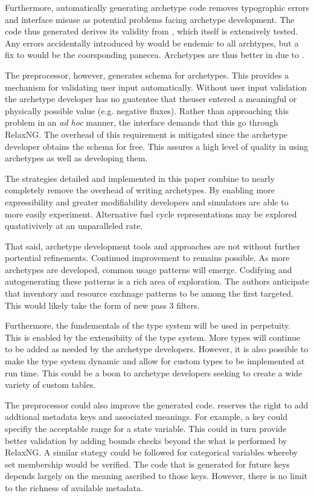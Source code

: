 Furthermore, automatically generating archetype code removes typographic errors and 
\cyclus interface misuse as potential problems facing archetype development. The 
code thus generated derives its validity from \cycpp, which itself is extensively 
tested. Any errors accidentally introduced by \cycpp would be endemic to all archtypes, 
but a fix to \cycpp would be the coorsponding panecea. Archetypes are thus 
better in \cyclus due to \cycpp.

The preprocessor, however, generates schema for archetypes. This provides a mechanism 
for validating user input automatically.  Without user input validation the archetype 
developer has no guatentee that theuser entered a meaningful or physically possible 
value (e.g. negative fluxes). Rather than approaching this problem in an \emph{ad hoc}
manner, the \cyclus interface demands that this go through RelaxNG.  The overhead 
of this requirement is mitigated since the archetype developer obtains the schema
for free. This assures a high level of quality in using archetypes as well as 
developing them.

The strategies detailed and implemented in this paper combine to nearly completely 
remove the overhead of writing archetypes. By enabling more expressibility and greater
modifiability developers and simulators are able to more easily experiment.  
Alternative fuel cycle representations may be explored quatativively at an
unparalleled rate.

That said, archetype development tools and approaches are not without further 
portential refinements. Continued improvement to \cycpp remains possible. As more 
archetypes are developed, common usage patterns will emerge. Codifying and 
autogenerating these patterns is a rich area of exploration. The authors anticipate 
that inventory and resource exchnage patterns to be among the first targeted.
This would likely take the form of new pass 3 filters.

Furthermore, the fundementals of the \cyclus type system will be used in perpetuity.
This is enabled by the extensibiity of the type system.  More types will continue to 
be added as needed by the archetype developers.  However, it is also possible to 
make the type system dynamic and allow for custom types to be implemented at run time.
This could be a boon to archetype developers seeking to create a wide variety of custom
tables.

The preprocessor could also improve the generated code. \Cyclus reserves the right
to add addtional metadata keys and associated meanings.  For example, a 
key could specifiy the acceptable range for a state variable. This could in turn 
provide better validation by adding bounds checks beyond the what is performed
by RelaxNG. A similar stategy could be followed for categorical variables whereby
set membership would be verified. The code that is generated for future keys 
depends largely on the meaning ascribed to those keys. However, there is no limit 
to the richness of available metadata.

